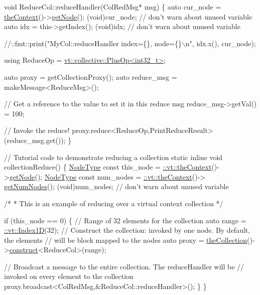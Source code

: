 \begin{DoxyCodeInclude}
\textcolor{keywordtype}{void} ReduceCol::reduceHandler(ColRedMsg* msg) \{
  \textcolor{keyword}{auto} cur\_node = \hyperlink{namespacevt_a26551fe0e6e6a1371111df5b12c7e92c}{theContext}()->\hyperlink{structvt_1_1ctx_1_1_context_a0d52c263ce8516546a67443d9a86fa5f}{getNode}();
  (void)cur\_node;  \textcolor{comment}{// don't warn about unused variable}
  \textcolor{keyword}{auto} idx = this->getIndex();
  (void)idx;  \textcolor{comment}{// don't warn about unused variable}

  \textcolor{comment}{//::fmt::print("MyCol::reduceHandler index=\{\}, node=\{\}\(\backslash\)n", idx.x(), cur\_node);}

  \textcolor{keyword}{using} ReduceOp = \hyperlink{structvt_1_1collective_1_1reduce_1_1operators_1_1_plus_op}{vt::collective::PlusOp<int32\_t>};

  \textcolor{keyword}{auto} proxy = getCollectionProxy();
  \textcolor{keyword}{auto} reduce\_msg = makeMessage<ReduceMsg>();

  \textcolor{comment}{// Get a reference to the value to set it in this reduce msg}
  reduce\_msg->getVal() = 100;

  \textcolor{comment}{// Invoke the reduce!}
  proxy.reduce<ReduceOp,PrintReduceResult>(reduce\_msg.get());
\}

\textcolor{comment}{// Tutorial code to demonstrate reducing a collection}
\textcolor{keyword}{static} \textcolor{keyword}{inline} \textcolor{keywordtype}{void} collectionReduce() \{
  \hyperlink{namespacevt_a866da9d0efc19c0a1ce79e9e492f47e2}{NodeType} \textcolor{keyword}{const} this\_node = \hyperlink{namespacevt_a26551fe0e6e6a1371111df5b12c7e92c}{::vt::theContext}()->\hyperlink{structvt_1_1ctx_1_1_context_a0d52c263ce8516546a67443d9a86fa5f}{getNode}();
  \hyperlink{namespacevt_a866da9d0efc19c0a1ce79e9e492f47e2}{NodeType} \textcolor{keyword}{const} num\_nodes = \hyperlink{namespacevt_a26551fe0e6e6a1371111df5b12c7e92c}{::vt::theContext}()->
      \hyperlink{structvt_1_1ctx_1_1_context_a7f41071aadf6d5fa9e1b6c703c5ff19d}{getNumNodes}();
  (void)num\_nodes;  \textcolor{comment}{// don't warn about unused variable}

  \textcolor{comment}{/*}
\textcolor{comment}{   * This is an example of reducing over a virtual context collection}
\textcolor{comment}{   */}

  \textcolor{keywordflow}{if} (this\_node == 0) \{
    \textcolor{comment}{// Range of 32 elements for the collection}
    \textcolor{keyword}{auto} range = \hyperlink{namespacevt_1_1index_a091a4f5a7a2c993d9727eaa60cf67d81}{::vt::Index1D}(32);
    \textcolor{comment}{// Construct the collection: invoked by one node. By default, the elements}
    \textcolor{comment}{// will be block mapped to the nodes}
    \textcolor{keyword}{auto} proxy = \hyperlink{namespacevt_a1c45ce63bfd2c327ff7d76a319a371d8}{theCollection}()->\hyperlink{structvt_1_1vrt_1_1collection_1_1_collection_manager_a4de84e9efd7a3948e3c20be549441cfd}{construct}<ReduceCol>(range);

    \textcolor{comment}{// Broadcast a message to the entire collection. The reduceHandler will be}
    \textcolor{comment}{// invoked on every element to the collection}
    proxy.broadcast<ColRedMsg,&ReduceCol::reduceHandler>();
  \}
\}
\end{DoxyCodeInclude}
